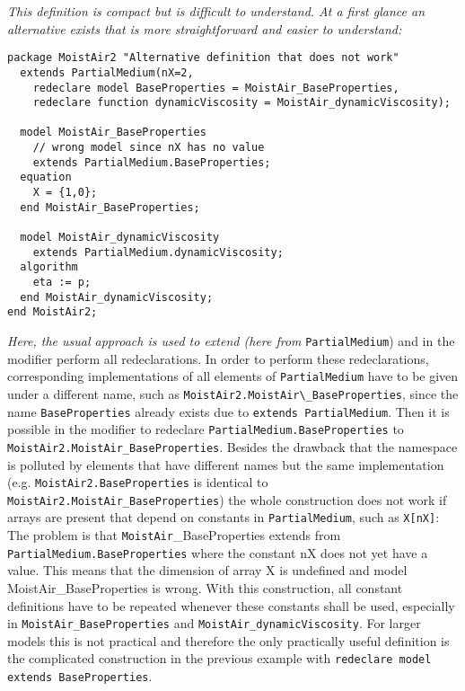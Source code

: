 \emph{This definition is compact but is difficult to understand. At a
first glance an alternative exists that is more straightforward and
easier to understand: }
\begin{lstlisting}[language=modelica]
package MoistAir2 "Alternative definition that does not work"
  extends PartialMedium(nX=2,
    redeclare model BaseProperties = MoistAir_BaseProperties,
    redeclare function dynamicViscosity = MoistAir_dynamicViscosity);

  model MoistAir_BaseProperties
    // wrong model since nX has no value
    extends PartialMedium.BaseProperties;
  equation
    X = {1,0};
  end MoistAir_BaseProperties;

  model MoistAir_dynamicViscosity
    extends PartialMedium.dynamicViscosity;
  algorithm
    eta := p;
  end MoistAir_dynamicViscosity;
end MoistAir2;
\end{lstlisting}

\emph{Here, the usual approach is used to extend (here from} \lstinline[basicstyle=\ttfamily]!PartialMedium!) and
in the modifier perform all redeclarations. In order to perform these
redeclarations, corresponding implementations of all elements of
\lstinline[basicstyle=\ttfamily]!PartialMedium! have to be given under a different name, such as
\lstinline[basicstyle=\ttfamily]!MoistAir2.MoistAir\_BaseProperties!, since the name \lstinline[basicstyle=\ttfamily]!BaseProperties!
already exists due to \lstinline[basicstyle=\ttfamily]!extends PartialMedium!. Then it is possible in
the modifier to redeclare \lstinline[basicstyle=\ttfamily]!PartialMedium.BaseProperties! to
\lstinline[basicstyle=\ttfamily]!MoistAir2.MoistAir_BaseProperties!. Besides the drawback that the
namespace is polluted by elements that have different names but the same
implementation (e.g. \lstinline[basicstyle=\ttfamily]!MoistAir2.BaseProperties! is identical to
\lstinline[basicstyle=\ttfamily]!MoistAir2.MoistAir_BaseProperties!) the whole construction does not work
if arrays are present that depend on constants in \lstinline[basicstyle=\ttfamily]!PartialMedium!, such as
  \lstinline[basicstyle=\ttfamily]!X[nX]!: The problem is that \lstinline[basicstyle=\ttfamily]!MoistAir!\_BaseProperties extends from
  \lstinline[basicstyle=\ttfamily]!PartialMedium.BaseProperties! where the constant nX does not yet have a
  value. This means that the dimension of array X is undefined and model
  MoistAir\_BaseProperties is wrong. With this construction, all constant
definitions have to be repeated whenever these constants shall be used,
especially in \lstinline[basicstyle=\ttfamily]!MoistAir_BaseProperties! and \lstinline[basicstyle=\ttfamily]!MoistAir_dynamicViscosity!.
For larger models this is not practical and therefore the only
practically useful definition is the complicated construction in the
previous example with \lstinline[basicstyle=\ttfamily]!redeclare model extends BaseProperties!.

